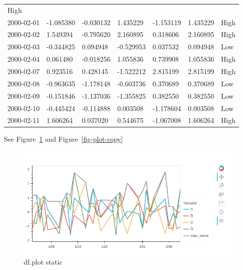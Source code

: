 \documentclass[
  letterpaper,
  DIV=11,
  numbers=noendperiod]{scrartcl}
\begin{document}
\begin{longtable}[]{@{}lllllll@{}}
High \\
2000-02-01 & -1.085380 & -0.030132 & 1.435229 & -1.153119 & 1.435229 &
High \\
2000-02-02 & 1.549394 & -0.795620 & 2.160895 & 0.318606 & 2.160895 &
High \\
2000-02-03 & -0.344825 & 0.094948 & -0.529953 & 0.037532 & 0.094948 &
Low \\
2000-02-04 & 0.061480 & -0.018256 & 1.055836 & 0.739908 & 1.055836 &
High \\
2000-02-07 & 0.923516 & 0.428145 & -1.522212 & 2.815199 & 2.815199 &
High \\
2000-02-08 & -0.963635 & -1.178148 & -0.603736 & 0.370689 & 0.370689 &
Low \\
2000-02-09 & -0.151846 & -1.137036 & -1.355825 & 0.382550 & 0.382550 &
Low \\
2000-02-10 & -0.445424 & -0.114888 & 0.003508 & -1.178604 & 0.003508 &
Low \\
2000-02-11 & 1.606264 & 0.037020 & 0.544675 & -1.067008 & 1.606264 &
High \\
\bottomrule()
\end{longtable}

See Figure~\ref{fig-plot} and Figure~\ref{fig-plot-copy}

\begin{figure}

{\centering \includegraphics{./testing_copy_files/figure-pdf/c230af73-2-image.png}

}

\caption{\label{fig-plot}df.plot static}

\end{figure}
\end{document}

